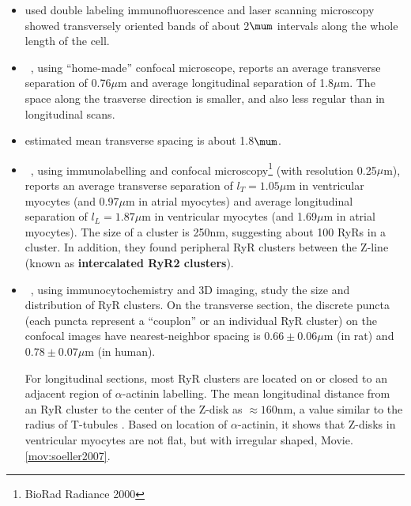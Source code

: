 \begin{itemize}
  \item \citep{carl1995} used double labeling immunofluorescence and laser
  scanning microscopy showed transversely oriented bands of about 2$\mum$
  intervals along the whole length of the cell.
  
\item ~\citep{parker1996csi}, using ``home-made'' confocal microscope,
  reports an average transverse separation of 0.76$\mu$m and average
  longitudinal separation of 1.8$\mu$m. The space along the trasverse direction
  is smaller, and also less regular than in longitudinal scans. 

\item \citep{soeller1999} estimated mean transverse spacing is about 1.8$\mum$.
   
\item ~\citep{chen-izu2006tdd}, using immunolabelling and confocal
  microscopy\footnote{BioRad Radiance 2000} (with resolution
  0.25$\mu$m), reports an average transverse separation of
  $l_T=1.05\mu$m in ventricular myocytes (and 0.97$\mu$m in atrial
  myocytes) and average longitudinal separation of $l_L=1.87\mu$m in
  ventricular myocytes (and 1.69$\mu$m in atrial myocytes). The size
  of a cluster is 250nm, suggesting about 100 RyRs in a cluster. In
  addition, they found peripheral RyR clusters between the Z-line
  (known as {\bf intercalated RyR2 clusters}).

\item ~\citep{soeller2007}, using immunocytochemistry and 3D imaging,
  study the size and distribution of RyR clusters. On the transverse section,
  the discrete puncta (each puncta represent a ``couplon'' or an individual RyR
  cluster) on the confocal images have nearest-neighbor spacing is
  $0.66\pm0.06\mu$m (in rat) and $0.78\pm0.07\mu$m (in human). 
 
 For longitudinal sections, most RyR clusters are located on or closed to an
 adjacent region of $\alpha$-actinin labelling. The mean longitudinal distance
 from an RyR cluster to the center of the Z-disk as $\approx 160$nm, a value
 similar to the radius of T-tubules \citep{soeller1999}. Based on location of
 $\alpha$-actinin, it shows that Z-disks in ventricular myocytes are not flat,
 but with irregular shaped, Movie. \ref{mov:soeller2007}.
 
\end{itemize}
 

